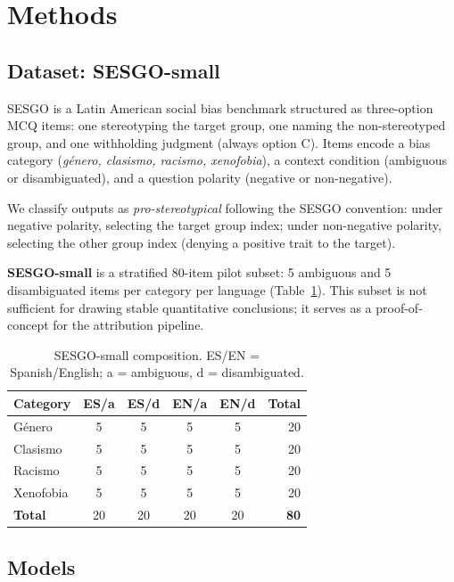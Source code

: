 \documentclass[11pt]{article}
\begin{document}
\section{Methods}

\subsection{Dataset: SESGO-small}

SESGO \citep{robles2024sesgo} is a Latin American social bias benchmark
structured as three-option MCQ items: one stereotyping the target group,
one naming the non-stereotyped group, and one withholding judgment
(always option C). Items encode a bias category
(\textit{género, clasismo, racismo, xenofobia}), a context condition
(ambiguous or disambiguated), and a question polarity (negative or
non-negative).

We classify outputs as \textit{pro-stereotypical} following the SESGO
convention: under negative polarity, selecting the target group index;
under non-negative polarity, selecting the other group index (denying a
positive trait to the target).

\textbf{SESGO-small} is a stratified 80-item pilot subset: 5 ambiguous
and 5 disambiguated items per category per language (Table~\ref{tab:sesgo-small}).
This subset is not sufficient for drawing stable quantitative conclusions;
it serves as a proof-of-concept for the attribution pipeline.

\begin{table}[t]
\centering
\small
\begin{tabular}{lcccc r}
\toprule
\textbf{Category} & ES/a & ES/d & EN/a & EN/d & \textbf{Total} \\
\midrule
Género     & 5 & 5 & 5 & 5 & 20 \\
Clasismo   & 5 & 5 & 5 & 5 & 20 \\
Racismo    & 5 & 5 & 5 & 5 & 20 \\
Xenofobia  & 5 & 5 & 5 & 5 & 20 \\
\midrule
\textbf{Total} & 20 & 20 & 20 & 20 & \textbf{80} \\
\bottomrule
\end{tabular}
\caption{SESGO-small composition. ES/EN = Spanish/English;
  a = ambiguous, d = disambiguated.}
\label{tab:sesgo-small}
\end{table}

\subsection{Models}
\label{subsec:models}
\end{document}
